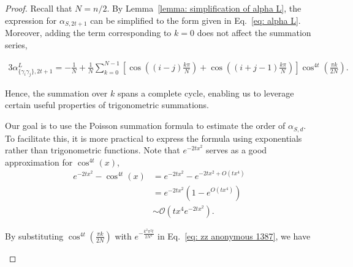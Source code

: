 \documentclass[showpacs,twocolumn,aps,prx,long bibliography,superscriptaddress,notitlepage]{revtex4-1}
\newcommand{\alpl}{\alpha_{\{\gamma_i\gamma_j\}, 2t+1}^{L}}
\begin{document}
\begin{proof}
Recall that $N = n/2$. By Lemma~\ref{lemma: simplification of alpha L}, the expression for $\alpha_{S,2t+1}$ can be simplified to the form given in Eq.~\eqref{eq: alpha L}. Moreover, adding the term corresponding to $k=0$ does not affect the summation series,
\begin{widetext}
    \begin{equation}
\label{eq: zz anonymous 1387}
\begin{aligned}
3\alpl 
=-\frac{1}{N}+\frac{1}{N} \sum_{k=0}^{N-1}\left[\cos \left((i-j) \frac{k \pi}{N}\right)+\cos \left((i+j-1) \frac{k \pi}{N}\right)\right] \cos ^{4 t}\left(\frac{\pi k}{2 N}\right).
\end{aligned}
\end{equation}

Hence, the summation over $k$ spans a complete cycle, enabling us to leverage certain useful properties of trigonometric summations.



Our goal is to use the Poisson summation formula to estimate the order of $\alpha_{S,d}$. To facilitate this, it is more practical to express the formula using exponentials rather than trigonometric functions. Note that $e^{-2tx^2}$ serves as a good approximation for $\cos^{4t}(x)$,
\begin{equation}
\begin{aligned}
e^{-2 t x^2}-\cos ^{4 t}(x) & =  e^{-2 t x^2}-e^{-2 t x^2+O\left(t x^4\right)} \\
&=  e^{-2 t x^2}\left(1-e^{O\left(t x^4\right)}\right) \\
&\sim \mathcal{O}\left(t x^4 e^{-2 t x^2}\right).
\end{aligned}
\end{equation}

By substituting $\cos ^{4 t}\left(\frac{\pi k}{2 N}\right)$ with $e^{-\frac{k^2 \pi^2 t}{2N^2}}$ in Eq.~\eqref{eq: zz anonymous 1387}, we have 


\end{widetext}
\end{proof}
\end{document}
